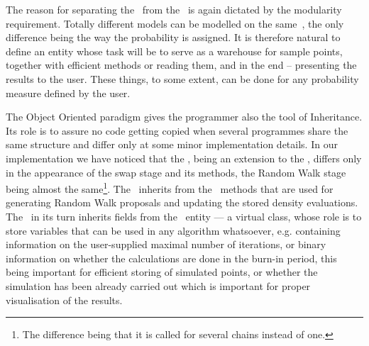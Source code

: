 The reason for separating the \measure\, from the \sspace\, is again dictated by the modularity requirement. Totally different models can be modelled on the same \sspace\,, the only difference being the way the probability is assigned. It is therefore natural to define an entity whose task will be to serve as a warehouse for sample points, together with efficient methods or reading them, and in the end -- presenting the results to the user. These things, to some extent, can be done for any probability measure defined by the user. 

The Object Oriented paradigm gives the programmer also the tool of Inheritance. Its role is to assure no code getting copied when several programmes share the same structure and differ only at some minor implementation details. In our implementation we have noticed that the \PTalgo, being an extension to the \MH, differs only in the appearance of the swap stage and its methods, the Random Walk stage being almost the same\footnote{The difference being that it is called for several chains instead of one.}. The \PTalgo\, inherits from the \MH\, methods that are used for generating Random Walk proposals and updating the stored density evaluations. The \MH\, in its turn inherits fields from the \algo\, entity --- a virtual class, whose role is to store variables that can be used in any algorithm whatsoever, e.g. containing information on the user-supplied maximal number of iterations, or binary information on whether the calculations are done in the burn-in period, this being important for efficient storing of simulated points, or whether the simulation has been already carried out which is important for proper visualisation of the results. 

